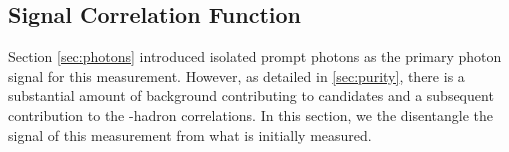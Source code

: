 \subsection{Signal Correlation Function}

Section \ref{sec:photons} introduced isolated prompt photons as the primary photon signal for this measurement. However, as detailed in \ref{sec:purity}, there is a substantial amount of background contributing to \gammaiso candidates and a subsequent contribution to the \gammaiso-hadron correlations. In this section, we the disentangle the signal of this measurement from what is initially measured.\\ 

